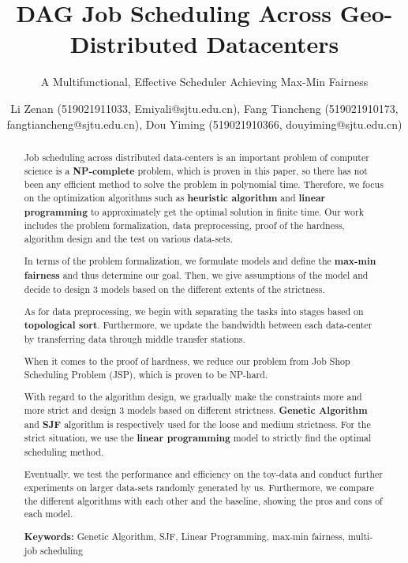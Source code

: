 \documentclass{llncs}
\title{DAG Job Scheduling Across Geo-Distributed Datacenters}
\subtitle{A Multifunctional, Effective Scheduler Achieving Max-Min Fairness \vspace{-3mm}}
\author{Li Zenan (519021911033, Emiyali@sjtu.edu.cn), Fang Tiancheng (519021910173, fangtiancheng@sjtu.edu.cn), Dou Yiming (519021910366, douyiming@sjtu.edu.cn)}
\institute{Department of Computer Science, \\ Shanghai Jiao Tong University, Shanghai, China}
\begin{document}



\maketitle
\begin{abstract}\vspace{-5mm}
Job scheduling across distributed data-centers is an important problem of computer science is a \textbf{NP-complete} problem, which is proven in this paper, so there has not been any efficient method to solve the problem in polynomial time. Therefore, we focus on the optimization algorithms such as \textbf{heuristic algorithm} and \textbf{linear programming} to approximately get the optimal solution in finite time. Our work includes the problem formalization, data preprocessing, proof of the hardness, algorithm design and the test on various data-sets.

In terms of the problem formalization, we formulate models and define the \textbf{max-min fairness} and thus determine our goal. Then, we give assumptions of the model and decide to design $3$ models based on the different extents of the strictness.

As for data preprocessing, we begin with separating the tasks into stages based on \textbf{topological sort}. Furthermore, we update the bandwidth between each data-center by transferring data through middle transfer stations.

When it comes to the proof of hardness, we reduce our problem from Job Shop Scheduling Problem (JSP), which is proven to be NP-hard.

With regard to the algorithm design, we gradually make the constraints more and more strict and design $3$ models based on different strictness. \textbf{Genetic Algorithm} and \textbf{SJF} algorithm is respectively used for the loose and medium strictness. For the strict situation, we use the \textbf{linear programming} model to strictly find the optimal scheduling method.

Eventually, we test the performance and efficiency on the toy-data and conduct further experiments on larger data-sets randomly generated by us. Furthermore, we compare the different algorithms with each other and the baseline, showing the pros and cons of each model.

\textbf{Keywords:} Genetic Algorithm, SJF, Linear Programming, max-min fairness, multi-job scheduling
\end{abstract}
\end{document}
